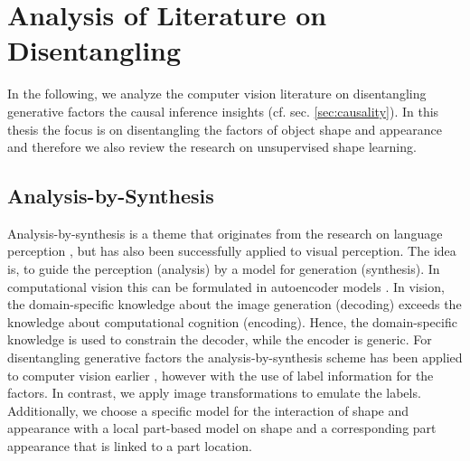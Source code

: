 \chapter{Analysis of Literature on Disentangling}\label{sec:literature}
	In the following, we analyze the computer vision literature on disentangling generative factors \wrt the causal inference insights (cf. sec. \ref{sec:causality}).
	In this thesis the focus is on disentangling the factors of object shape and appearance and therefore we also review the research on unsupervised shape learning.


\section{Analysis-by-Synthesis}
	Analysis-by-synthesis is a theme that originates from the research on language perception \eg \cite{bever10anabysyn}, but has also been successfully applied to visual perception.
	The idea is, to guide the perception (analysis) by a model for generation (synthesis).
	In computational vision this can be formulated in autoencoder models \cite{tieleman14thesis}.
	In vision, the domain-specific knowledge about the image generation (decoding) exceeds the knowledge about computational cognition (encoding).
	Hence, the domain-specific knowledge is used to constrain the decoder, while the encoder is generic.
	For disentangling generative factors the analysis-by-synthesis scheme has been applied to computer vision earlier \cite{kulkarni15dcign, yildirim15anabysyn, desjardins12genentangle}, however with the use of label information for the factors.
	In contrast, we apply image transformations to emulate the labels.
	Additionally, we choose a specific model for the interaction of shape and appearance with a local part-based model on shape and a corresponding part appearance that is linked to a part location.



